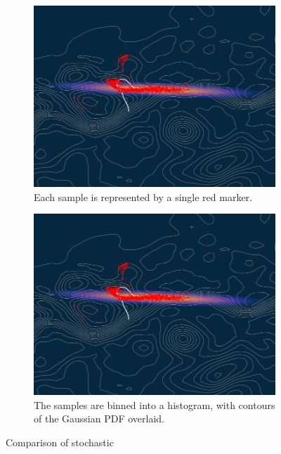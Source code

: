 \begin{figure}
	\begin{center}
		\begin{subfigure}{0.8\textwidth}
			\includegraphics[width=\textwidth]{figures/gulf_stream_motivation/single_gaussian.pdf}
			\caption{Each sample is represented by a single red marker.}
			\label{fig:}
		\end{subfigure}
		\begin{subfigure}{0.8\textwidth}
			\includegraphics[width=\textwidth]{figures/gulf_stream_motivation/single_gaussian.pdf}
			\caption{The samples are binned into a histogram, with contours of the Gaussian PDF overlaid.}
			\label{fig:}
		\end{subfigure}
		\caption{Comparison of stochastic}
	\end{center}
\end{figure}




